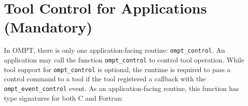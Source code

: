 \documentclass{article}
\begin{document}

 \section{Tool Control for Applications (Mandatory)}
 \label{sec:app-facing}
 
 In OMPT, there is only one application-facing routine:  \verb|ompt_control|. 
An application may call the function \verb|ompt_control|  to  control tool operation. While tool support for \verb|ompt_control| is optional, the runtime is required to pass a control command to a tool if the tool registered a callback with the \verb|ompt_event_control| event. As an application-facing routine, this function has type signatures for both C and Fortran:
\end{document}
